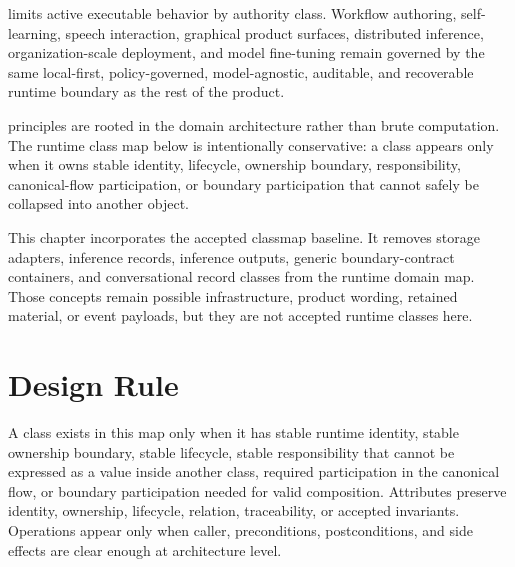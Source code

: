 \documentclass[11pt]{report}
\begin{document}
\Madre limits active executable behavior by authority class. Workflow authoring, self-learning, speech interaction, graphical product surfaces, distributed inference, organization-scale deployment, and model fine-tuning remain governed by the same local-first, policy-governed, model-agnostic, auditable, and recoverable runtime boundary as the rest of the product.


\Madre principles are rooted in the domain architecture rather than brute computation. The runtime class map below is intentionally conservative: a class appears only when it owns stable identity, lifecycle, ownership boundary, responsibility, canonical-flow participation, or boundary participation that cannot safely be collapsed into another object.\n

This chapter incorporates the accepted classmap baseline. It removes storage adapters, inference records, inference outputs, generic boundary-contract containers, and conversational record classes from the runtime domain map. Those concepts remain possible infrastructure, product wording, retained material, or event payloads, but they are not accepted runtime classes here.\n

\section{Design Rule}

A class exists in this map only when it has stable runtime identity, stable ownership boundary, stable lifecycle, stable responsibility that cannot be expressed as a value inside another class, required participation in the canonical \Madre flow, or boundary participation needed for valid composition. Attributes preserve identity, ownership, lifecycle, relation, traceability, or accepted invariants. Operations appear only when caller, preconditions, postconditions, and side effects are clear enough at architecture level.\n
\end{document}
